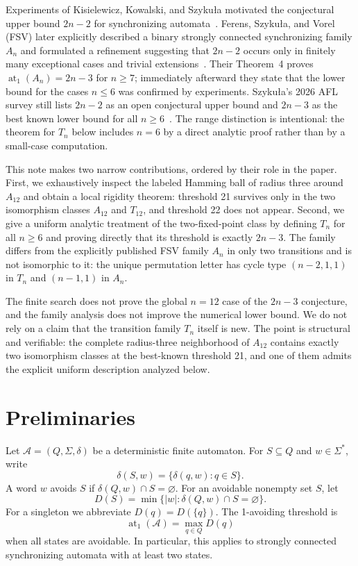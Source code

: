 \documentclass[11pt]{article}
\theoremstyle{definition}
\theoremstyle{remark}
\begin{document}
Experiments of Kisielewicz, Kowalski, and Szyku\l a motivated the conjectural upper bound $2n-2$ for synchronizing automata~\cite{KKS2016}. Ferens, Szyku\l a, and Vorel (FSV) later explicitly described a binary strongly connected synchronizing family $A_n$ and formulated a refinement suggesting that $2n-2$ occurs only in finitely many exceptional cases and trivial extensions~\cite{FSV2021}. Their Theorem~4 proves $\operatorname{at}_1(A_n)=2n-3$ for $n\ge7$; immediately afterward they state that the lower bound for the cases $n\le6$ was confirmed by experiments. Szyku\l a's 2026 AFL survey still lists $2n-2$ as an open conjectural upper bound and $2n-3$ as the best known lower bound for all $n\ge6$~\cite{Szykula2026}. The range distinction is intentional: the theorem for $T_n$ below includes $n=6$ by a direct analytic proof rather than by a small-case computation.

This note makes two narrow contributions, ordered by their role in the paper. First, we exhaustively inspect the labeled Hamming ball of radius three around $A_{12}$ and obtain a local rigidity theorem: threshold 21 survives only in the two isomorphism classes $A_{12}$ and $T_{12}$, and threshold 22 does not appear. Second, we give a uniform analytic treatment of the two-fixed-point class by defining $T_n$ for all $n\ge6$ and proving directly that its threshold is exactly $2n-3$. The family differs from the explicitly published FSV family $A_n$ in only two transitions and is not isomorphic to it: the unique permutation letter has cycle type $(n-2,1,1)$ in $T_n$ and $(n-1,1)$ in $A_n$.

The finite search does not prove the global $n=12$ case of the $2n-3$ conjecture, and the family analysis does not improve the numerical lower bound. We do not rely on a claim that the transition family $T_n$ itself is new. The point is structural and verifiable: the complete radius-three neighborhood of $A_{12}$ contains exactly two isomorphism classes at the best-known threshold 21, and one of them admits the explicit uniform description analyzed below.

\section{Preliminaries}
Let $\mathcal A=(Q,\Sigma,\delta)$ be a deterministic finite automaton. For $S\subseteq Q$ and $w\in\Sigma^*$, write
\[
  \delta(S,w)=\{\delta(q,w):q\in S\}.
\]
A word $w$ avoids $S$ if $\delta(Q,w)\cap S=\varnothing$. For an avoidable nonempty set $S$, let
\[
  D(S)=\min\{|w|:\delta(Q,w)\cap S=\varnothing\}.
\]
For a singleton we abbreviate $D(q)=D(\{q\})$. The 1-avoiding threshold is
\[
  \operatorname{at}_1(\mathcal A)=\max_{q\in Q} D(q)
\]
when all states are avoidable. In particular, this applies to strongly connected synchronizing automata with at least two states.
\end{document}
